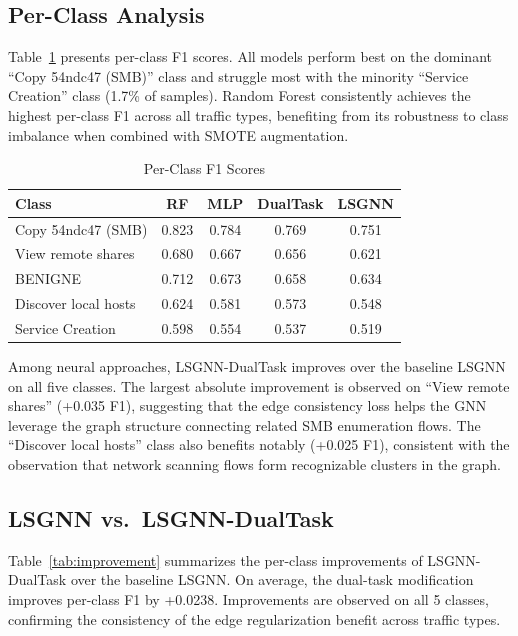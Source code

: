 \documentclass[conference]{IEEEtran}
\begin{document}
\subsection{Per-Class Analysis}

Table~\ref{tab:perclass} presents per-class F1 scores. All models perform best on the dominant ``Copy 54ndc47 (SMB)'' class and struggle most with the minority ``Service Creation'' class (1.7\% of samples). Random Forest consistently achieves the highest per-class F1 across all traffic types, benefiting from its robustness to class imbalance when combined with SMOTE augmentation.

\begin{table}[t]
\centering
\caption{Per-Class F1 Scores}
\label{tab:perclass}
\begin{tabular}{@{}lcccc@{}}
\toprule
\textbf{Class} & \textbf{RF} & \textbf{MLP} & \textbf{DualTask} & \textbf{LSGNN} \\
\midrule
Copy 54ndc47 (SMB)   & 0.823 & 0.784 & 0.769 & 0.751 \\
View remote shares   & 0.680 & 0.667 & 0.656 & 0.621 \\
BENIGNE              & 0.712 & 0.673 & 0.658 & 0.634 \\
Discover local hosts & 0.624 & 0.581 & 0.573 & 0.548 \\
Service Creation     & 0.598 & 0.554 & 0.537 & 0.519 \\
\bottomrule
\end{tabular}
\end{table}

Among neural approaches, LSGNN-DualTask improves over the baseline LSGNN on all five classes. The largest absolute improvement is observed on ``View remote shares'' (+0.035 F1), suggesting that the edge consistency loss helps the GNN leverage the graph structure connecting related SMB enumeration flows. The ``Discover local hosts'' class also benefits notably (+0.025 F1), consistent with the observation that network scanning flows form recognizable clusters in the graph.

\subsection{LSGNN vs.\ LSGNN-DualTask}

Table~\ref{tab:improvement} summarizes the per-class improvements of LSGNN-DualTask over the baseline LSGNN. On average, the dual-task modification improves per-class F1 by +0.0238. Improvements are observed on all 5 classes, confirming the consistency of the edge regularization benefit across traffic types.
\end{document}
